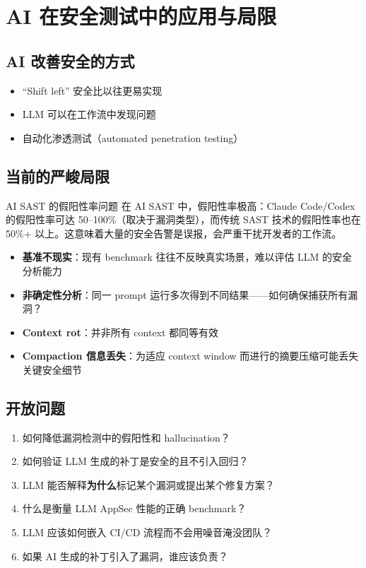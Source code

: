 \documentclass[a4paper]{article}
\begin{document}
\section{AI 在安全测试中的应用与局限}

\subsection{AI 改善安全的方式}

\begin{itemize}
    \item ``Shift left'' 安全比以往更易实现
    \item LLM 可以在工作流中发现问题
    \item 自动化渗透测试（automated penetration testing）
\end{itemize}

\subsection{当前的严峻局限}

\begin{warningbox}{AI SAST 的假阳性率问题}
在 AI SAST 中，假阳性率极高：Claude Code/Codex 的假阳性率可达 50--100\%（取决于漏洞类型），而传统 SAST 技术的假阳性率也在 50\%+ 以上。这意味着大量的安全告警是误报，会严重干扰开发者的工作流。
\end{warningbox}

\begin{itemize}
    \item \textbf{基准不现实}：现有 benchmark 往往不反映真实场景，难以评估 LLM 的安全分析能力
    \item \textbf{非确定性分析}：同一 prompt 运行多次得到不同结果——如何确保捕获所有漏洞？
    \item \textbf{Context rot}：并非所有 context 都同等有效
    \item \textbf{Compaction 信息丢失}：为适应 context window 而进行的摘要压缩可能丢失关键安全细节
\end{itemize}

\subsection{开放问题}

\begin{enumerate}
    \item 如何降低漏洞检测中的假阳性和 hallucination？
    \item 如何验证 LLM 生成的补丁是安全的且不引入回归？
    \item LLM 能否解释\textbf{为什么}标记某个漏洞或提出某个修复方案？
    \item 什么是衡量 LLM AppSec 性能的正确 benchmark？
    \item LLM 应该如何嵌入 CI/CD 流程而不会用噪音淹没团队？
    \item 如果 AI 生成的补丁引入了漏洞，谁应该负责？
\end{enumerate}
\end{document}
